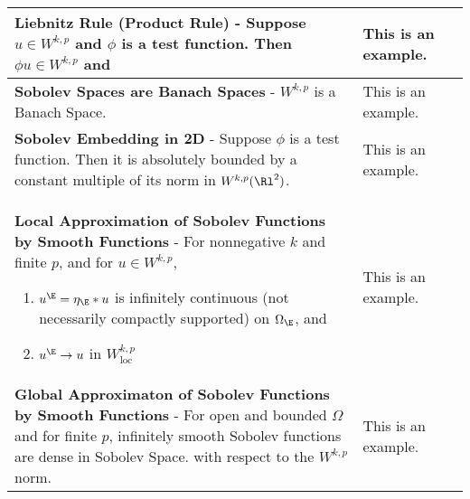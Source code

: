 \begin{longtable}{|*{3}{>{\centering\arraybackslash}p{}|}}
            \textbf{Liebnitz Rule (Product Rule)} - Suppose $u \in W^{k,p}$ and $\phi$ is a test function.  Then $\phi u \in W^{k,p}$ and \newline {$\!\begin{gathered} D^\alpha(\phi u) = \sum_{\abs{\beta} \leq \abs{\alpha}} \binom{\alpha}{\beta}D^\alpha \phi D^{\alpha - \beta} u \end{gathered}$} & This is an example. \\[6pt] \hline
            
            \textbf{Sobolev Spaces are Banach Spaces} - $W^{k,p}$ is a Banach Space. & This is an example. \\[6pt] \hline
            
            \textbf{Sobolev Embedding in 2D} - Suppose $\phi$ is a test function.  Then it is absolutely bounded by a constant multiple of its norm in $W^{k,p}(\Rl^2)$. \newline {$\!\begin{gathered} \max_{x\in\Rl^2}\abs{u(x)} \leq C \norm{u}_{W^{k,p}(\Rl^2)} \end{gathered}$} & This is an example. \\[6pt] \hline
            
            \textbf{Local Approximation of Sobolev Functions by Smooth Functions} - For nonnegative $k$ and finite $p$, and for $u \in W^{k,p}$, \begin{enumerate}
                \item
                    $u^\E = \eta_\E * u$ is infinitely continuous (not necessarily compactly supported) on $\Omega_\E$, and
                \item
                    $u^\E \rightarrow u$ in $W_\text{loc}^{k,p}$
            \end{enumerate} & This is an example. \\[6pt] \hline
            
            \textbf{Global Approximaton of Sobolev Functions by Smooth Functions} - For open and bounded $\Omega$ and for finite $p$, infinitely smooth Sobolev functions are dense in Sobolev Space. \newline {$\!\begin{gathered} \mathcal{C}^\infty(\Omega) \cap W^{k,p}(\Omega) \qquad \text{is dense in} \qquad W^{k,p}(\Omega) \end{gathered}$} \newline with respect to the $W^{k,p}$ norm. & This is an example. \\[6pt] \hline
            

\end{longtable}
